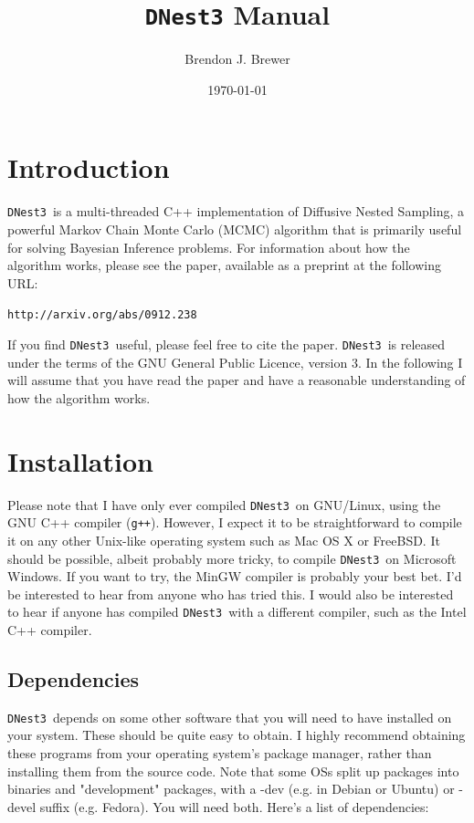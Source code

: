 \documentclass[a4paper, 11pt]{article}
\title{{\tt DNest3} Manual}
\author{Brendon J. Brewer}
\date{\today}
\newcommand{\dnest}{{\tt DNest3}}
\begin{document}
\maketitle

\section{Introduction}

\dnest~is a multi-threaded C++ implementation of Diffusive Nested Sampling, a
powerful Markov Chain Monte Carlo (MCMC) algorithm that is primarily
useful for solving Bayesian Inference problems. For information about how the
algorithm works, please see the paper, available as a preprint at the following
URL:

\begin{center}
{\tt http://arxiv.org/abs/0912.238}
\end{center}

If you find \dnest~useful, please feel free to cite the paper. \dnest~is
released under the terms of the GNU General Public Licence, version 3.
In the following I will assume that you have read the paper and have a
reasonable understanding of how the algorithm works.

\section{Installation}
Please note that I have only ever compiled \dnest~on GNU/Linux,
using the GNU C++ compiler ({\tt g++}). However, I expect it to be
straightforward to compile it on any other Unix-like operating system such as Mac
OS X or FreeBSD. It should be possible, albeit probably more tricky,
to compile \dnest~on Microsoft Windows. If you want to try,
the MinGW compiler is
probably your best bet. I'd be interested to hear from anyone who
has tried this. I would also be interested to hear if anyone has
compiled \dnest~with a different compiler, such as the Intel C++
compiler.

\subsection{Dependencies}
\dnest~depends on some other software that you will need to have installed on
your system. These should be quite easy to obtain. I highly
recommend obtaining these programs from your operating system's package manager,
rather than installing them from the source code. Note that some OSs split up
packages into binaries and "development" packages, with a -dev (e.g.
in Debian or Ubuntu) or -devel suffix (e.g. Fedora). You will need
both. Here's a list of dependencies:
\end{document}
